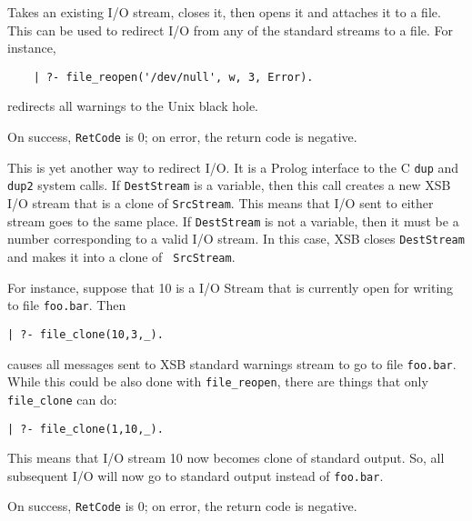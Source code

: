 \begin{description}

    Takes an existing I/O stream, closes it, then opens it and
    attaches it to a file. This can be used to redirect I/O from any of the
    standard streams to a file. For instance, 
\begin{verbatim}
    | ?- file_reopen('/dev/null', w, 3, Error).
\end{verbatim}
    redirects all warnings to the Unix black hole. 

    On success, {\tt RetCode} is 0; on error, the return code is negative.


This is yet another way to redirect I/O. It is a Prolog interface to
the C {\tt dup} and {\tt dup2} system calls. If {\tt DestStream} is a
variable, then this call creates a new XSB I/O stream that is a clone
of {\tt SrcStream}. This means that I/O sent to either stream goes
to the same place. If {\tt DestStream} is not a variable, then it must
be a number corresponding to a valid I/O stream. In this case, XSB
closes {\tt DestStream} and makes it into a clone of {\tt
SrcStream}. 

For instance, suppose that 10 is a I/O Stream that is currently open
for writing to file {\tt foo.bar}.  Then 
\begin{verbatim} 
| ?- file_clone(10,3,_).  
\end{verbatim} 
causes all messages sent to XSB standard warnings stream to go to file
{\tt foo.bar}. While this could be also done with {\tt file\_reopen},
there are things that only {\tt file\_clone} can do: 
\begin{verbatim} 
| ?- file_clone(1,10,_). 
 \end{verbatim} 
This means that I/O stream 10 now becomes clone of standard
output. So, all subsequent I/O will now go to standard output instead
of {\tt foo.bar}.

On success, {\tt RetCode} is 0; on error, the return code is negative.


\end{description}

